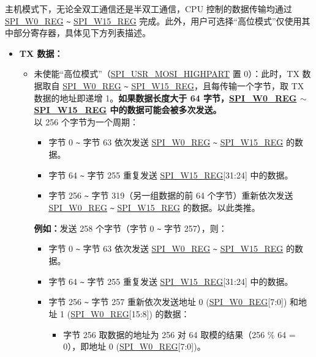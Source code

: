 \documentclass[main\_\_CN.tex]{subfiles}
\begin{document}
主机模式下，无论全双工通信还是半双工通信，CPU 控制的数据传输均通过 \hyperref[regdesc:SPIW0REG]{SPI\_W0\_REG} \verb+~+ \hyperref[regdesc:SPIW15REG]{SPI\_W15\_REG} 完成。此外，用户可选择“高位模式”仅使用其中部分寄存器，具体见下方列表描述。
\begin{itemize}
    \item \textbf{TX 数据：}
    \begin{itemize}
        \item 未使能“高位模式”（\hyperref[fielddesc:SPIUSRMOSIHIGHPART]{SPI\_USR\_MOSI\_HIGHPART} 置 0）：此时，TX 数据取自 \hyperref[regdesc:SPIW0REG]{SPI\_W0\_REG} \verb+~+ \hyperref[regdesc:SPIW15REG]{SPI\_W15\_REG}，且每传输一个字节，取 TX 数据的地址即递增 1。\textbf{如果数据长度大于 64 字节，\hyperref[regdesc:SPIW0REG]{SPI\_W0\_REG} $\sim$ \hyperref[regdesc:SPIW15REG]{SPI\_W15\_REG} 中的数据可能会被多次发送。}\\
        以 256 个字节为一个周期：
        \begin{itemize}
            \item 字节 0 \verb+~+ 字节 63 依次发送 \hyperref[regdesc:SPIW0REG]{SPI\_W0\_REG} \verb+~+ \hyperref[regdesc:SPIW15REG]{SPI\_W15\_REG} 的数据。
            \item 字节 64 \verb+~+ 字节 255 重复发送 \hyperref[regdesc:SPIW15REG]{SPI\_W15\_REG}[31:24] 中的数据。
            \item 字节 256 \verb+~+ 字节 319（另一组数据的前 64 个字节）重新依次发送 \hyperref[regdesc:SPIW0REG]{SPI\_W0\_REG} \verb+~+ \hyperref[regdesc:SPIW15REG]{SPI\_W15\_REG} 的数据。以此类推。
        \end{itemize}
        \textbf{例如：}发送 258 个字节（字节 0 \verb+~+ 字节 257），则：
        \begin{itemize}
            \item 字节 0 \verb+~+ 字节 63 依次发送 \hyperref[regdesc:SPIW0REG]{SPI\_W0\_REG} \verb+~+ \hyperref[regdesc:SPIW15REG]{SPI\_W15\_REG} 的数据。
            \item 字节 64 \verb+~+ 字节 255 重复发送 \hyperref[regdesc:SPIW15REG]{SPI\_W15\_REG}[31:24] 中的数据。
            \item 字节 256 \verb+~+ 字节 257 重新依次发送地址 0 (\hyperref[regdesc:SPIW0REG]{SPI\_W0\_REG}[7:0]) 和地址 1 (\hyperref[regdesc:SPIW0REG]{SPI\_W0\_REG}[15:8]) 的数据：
                \begin{itemize}
                    \item 字节 256 取数据的地址为 256 对 64 取模的结果（256 \% 64 = 0），即地址 0 (\hyperref[regdesc:SPIW0REG]{SPI\_W0\_REG}[7:0])。

\end{itemize}
\end{itemize}
\end{itemize}
\end{itemize}
\end{document}
